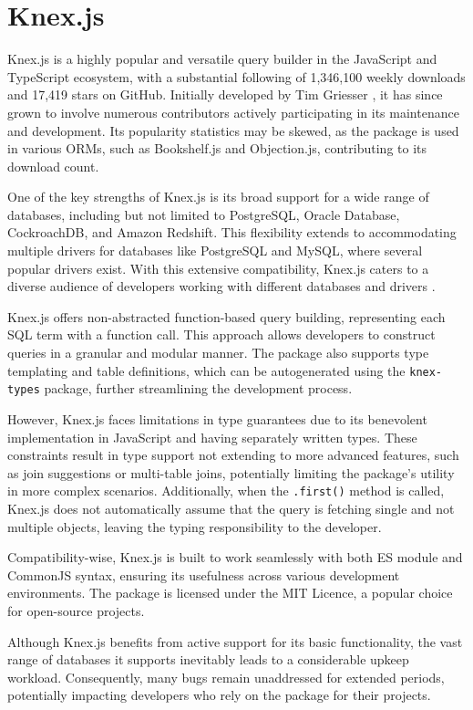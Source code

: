 \section{Knex.js}
Knex.js is a highly popular and versatile query builder in the JavaScript and
TypeScript ecosystem, with a substantial following of 1,346,100 weekly downloads
and 17,419 stars on GitHub. Initially developed by Tim Griesser
\cite{KnexCommits}, it has since grown to involve numerous contributors actively
participating in its maintenance and development. Its popularity statistics may
be skewed, as the package is used in various ORMs, such as Bookshelf.js and
Objection.js, contributing to its download count.

One of the key strengths of Knex.js is its broad support for a wide range of
databases, including but not limited to PostgreSQL, Oracle Database,
CockroachDB, and Amazon Redshift. This flexibility extends to accommodating
multiple drivers for databases like PostgreSQL and MySQL, where several popular
drivers exist. With this extensive compatibility, Knex.js caters to a diverse
audience of developers working with different databases and drivers
\cite{knexDocumentation}.

Knex.js offers non-abstracted function-based query building, representing each
SQL term with a function call. This approach allows developers to construct
queries in a granular and modular manner. The package also supports type
templating and table definitions, which can be autogenerated using the
\texttt{knex-types} \cite{knexTypes} package, further streamlining the
development process.

However, Knex.js faces limitations in type guarantees due to its benevolent
implementation in JavaScript and having separately written types. These
constraints result in type support not extending to more advanced features, such
as join suggestions or multi-table joins, potentially limiting the package's
utility in more complex scenarios. Additionally, when the \texttt{.first()}
method is called, Knex.js does not automatically assume that the query is
fetching single and not multiple objects, leaving the typing responsibility to
the developer.

Compatibility-wise, Knex.js is built to work seamlessly with both ES module and
CommonJS syntax, ensuring its usefulness across various development
environments. The package is licensed under the MIT Licence, a popular choice
for open-source projects.

Although Knex.js benefits from active support for its basic functionality, the
vast range of databases it supports inevitably leads to a considerable upkeep
workload. Consequently, many bugs remain unaddressed for extended periods,
potentially impacting developers who rely on the package for their projects.

